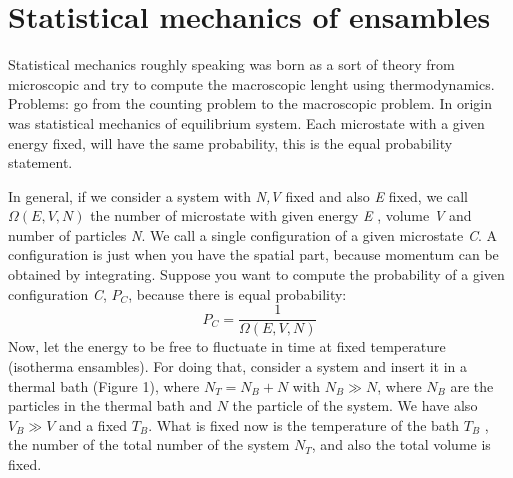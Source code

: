 \documentclass[../main/main.tex]{subfiles}
\begin{document}

\section{Statistical mechanics of ensambles}

Statistical mechanics roughly speaking was born as a sort of theory from microscopic and try to compute the macroscopic lenght using thermodynamics. Problems: go from the counting problem to the macroscopic problem.
In origin was statistical mechanics of equilibrium system.
Each microstate with a given energy fixed, will have the same probability, this is the equal probability statement.

In general, if we consider a system with \emph{N,V} fixed and also \emph{E} fixed, we call \( \Omega (E,V,N) \)  the number of microstate with given energy \emph{E} , volume \emph{V} and number of particles \emph{N}.
We call  a single configuration of a given microstate \emph{C}. A configuration is just when you have the spatial part, because momentum can be obtained by integrating.
Suppose you want to compute the probability of a given configuration \emph{C}, \( P_C \), because there is equal probability:
\begin{equation}
  P_C = \frac{1}{\Omega (E,V,N)}
  \label{eq:}
\end{equation}
Now, let the energy to be free to fluctuate in time at fixed temperature (isotherma ensambles). For doing that, consider a system and insert it in a thermal bath (Figure 1), where \( N_T = N_B + N\)  with \( N_B \gg N \), where \( N_B \) are the particles in the thermal bath and \( N \) the particle of the system. We have also \( V_B \gg V \) and a fixed \( T_B \).
What is fixed now is the temperature of the bath \( T_B \) , the number of the total number of the system \( N_T \), and also the total volume is fixed.
\end{document}
